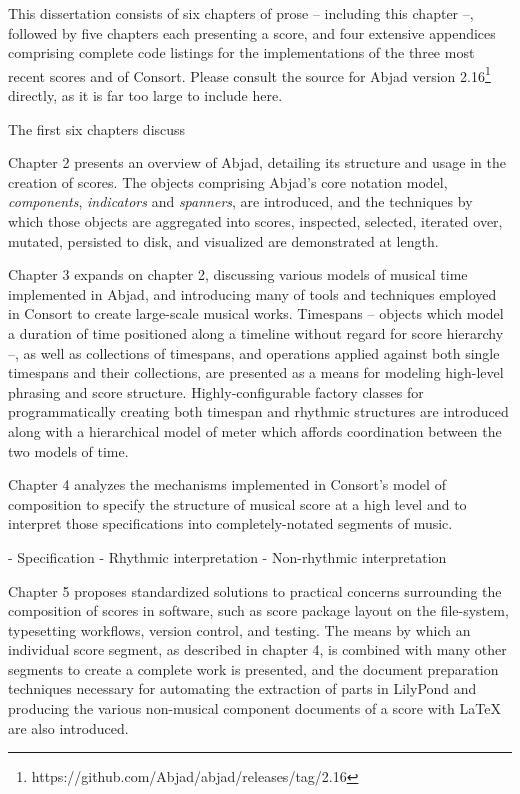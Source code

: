 This dissertation consists of six chapters of prose -- including this chapter
--, followed by five chapters each presenting a score, and four extensive
appendices comprising complete code listings for the implementations of the
three most recent scores and of Consort. Please consult the source for Abjad
version 2.16\footnote{https://github.com/Abjad/abjad/releases/tag/2.16}
directly, as it is far too large to include here.

The first six chapters discuss  

Chapter 2 presents an overview of Abjad, detailing its structure and usage in
the creation of scores. The objects comprising Abjad's core notation model,
\emph{components}, \emph{indicators} and \emph{spanners}, are introduced, and
the techniques by which those objects are aggregated into scores, inspected,
selected, iterated over, mutated, persisted to disk, and visualized are
demonstrated at length.

Chapter 3 expands on chapter 2, discussing various models of musical time
implemented in Abjad, and introducing many of tools and techniques employed in
Consort to create large-scale musical works. Timespans -- objects which model a
duration of time positioned along a timeline without regard for score
hierarchy --, as well as collections of timespans, and operations applied
against both single timespans and their collections, are presented as a means
for modeling high-level phrasing and score structure. Highly-configurable
factory classes for programmatically creating both timespan and rhythmic
structures are introduced along with a hierarchical model of meter which
affords coordination between the two models of time.

Chapter 4 analyzes the mechanisms implemented in Consort's model of composition
to specify the structure of musical score at a high level and to interpret
those specifications into completely-notated segments of music.

- Specification
- Rhythmic interpretation
- Non-rhythmic interpretation

Chapter 5 proposes standardized solutions to practical concerns surrounding the
composition of scores in software, such as score package layout on the
file-system, typesetting workflows, version control, and testing. The means by
which an individual score segment, as described in chapter 4, is combined with
many other segments to create a complete work is presented, and the document
preparation techniques necessary for automating the extraction of parts in
LilyPond and producing the various non-musical component documents of a score
with \LaTeX{} are also introduced.


